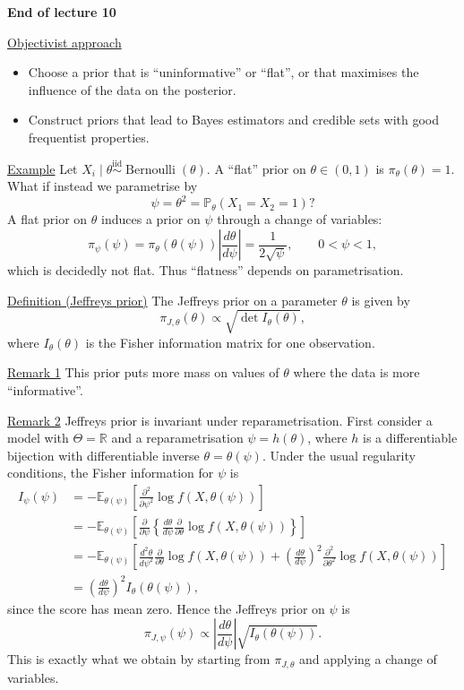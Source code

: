 \documentclass[11pt,a4paper]{article}
\begin{document}
\begin{center}
\textbf{End of lecture 10}
\end{center}

\noindent\underline{Objectivist approach}
\begin{itemize}
\item Choose a prior that is ``uninformative'' or ``flat'', or that maximises
the influence of the data on the posterior.
\item Construct priors that lead to Bayes estimators and credible sets with
good frequentist properties.
\end{itemize}

\noindent\underline{Example}\quad
Let $X_i\mid\theta\overset{\mathrm{iid}}{\sim}\operatorname{Bernoulli}(\theta)$.
A ``flat'' prior on $\theta\in(0,1)$ is $\pi_\theta(\theta)=1$.
What if instead we parametrise by
\[
\psi=\theta^2=\mathbb P_\theta(X_1=X_2=1)?
\]
A flat prior on $\theta$ induces a prior on $\psi$ through a change of variables:
\[
\pi_\psi(\psi)
=\pi_\theta(\theta(\psi))\left|\frac{d\theta}{d\psi}\right|
=\frac{1}{2\sqrt\psi},\qquad 0<\psi<1,
\]
which is decidedly not flat. Thus ``flatness'' depends on parametrisation.

\medskip
\noindent\underline{Definition (Jeffreys prior)}\quad
The Jeffreys prior on a parameter $\theta$ is given by
\[
\pi_{J,\theta}(\theta)\propto\sqrt{\det I_\theta(\theta)},
\]
where $I_\theta(\theta)$ is the Fisher information matrix for one observation.

\medskip
\noindent\underline{Remark 1}\quad
This prior puts more mass on values of $\theta$ where the data is more
``informative''.

\medskip
\noindent\underline{Remark 2}\quad
Jeffreys prior is invariant under reparametrisation.
First consider a model with $\Theta=\mathbb R$ and a reparametrisation
$\psi=h(\theta)$, where $h$ is a differentiable bijection with differentiable
inverse $\theta=\theta(\psi)$. Under the usual regularity conditions,
the Fisher information for $\psi$ is
\[
\begin{aligned}
I_\psi(\psi)
&=-\mathbb E_{\theta(\psi)}\left[
\frac{\partial^2}{\partial\psi^2}\log f(X,\theta(\psi))\right]\\
&=-\mathbb E_{\theta(\psi)}\left[
\frac{\partial}{\partial\psi}\left\{
\frac{d\theta}{d\psi}\frac{\partial}{\partial\theta}
\log f(X,\theta(\psi))\right\}\right]\\
&=-\mathbb E_{\theta(\psi)}\left[
\frac{d^2\theta}{d\psi^2}\frac{\partial}{\partial\theta}
\log f(X,\theta(\psi))
+\left(\frac{d\theta}{d\psi}\right)^2
\frac{\partial^2}{\partial\theta^2}\log f(X,\theta(\psi))\right]\\
&=\left(\frac{d\theta}{d\psi}\right)^2 I_\theta(\theta(\psi)),
\end{aligned}
\]
since the score has mean zero. Hence the Jeffreys prior on $\psi$ is
\[
\pi_{J,\psi}(\psi)
\propto\left|\frac{d\theta}{d\psi}\right|
\sqrt{I_\theta(\theta(\psi))}.
\]
This is exactly what we obtain by starting from $\pi_{J,\theta}$ and applying
a change of variables.
\end{document}

